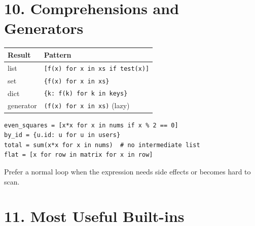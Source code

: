 \documentclass[10pt,a4paper]{article}
\newcommand{\py}[1]{\texttt{#1}}
\newenvironment{tbl}{\par\begin{lrbox}{\tblbox}\begin{minipage}{\linewidth}\compacttable}%
  {\end{minipage}\end{lrbox}\noindent\raisebox{\dp\tblbox}{\usebox{\tblbox}}\par}
\newcommand{\compacttable}{\fontsize{10}{11.2}\selectfont\setlength{\tabcolsep}{2.5pt}\renewcommand{\arraystretch}{1.08}}
\begin{document}
\begin{multicols}{2}
\section{10. Comprehensions and Generators}

\begin{tbl}
\begin{tabularx}{\linewidth}{@{}R{.32\linewidth}L@{}}
\toprule
\textbf{Result} & \textbf{Pattern} \\
\midrule
list & \py{[f(x) for x in xs if test(x)]} \\
set & \py{\{f(x) for x in xs\}} \\
dict & \py{\{k: f(k) for k in keys\}} \\
generator & \py{(f(x) for x in xs)} (lazy) \\
\bottomrule
\end{tabularx}
\end{tbl}

\begin{lstlisting}
even_squares = [x*x for x in nums if x % 2 == 0]
by_id = {u.id: u for u in users}
total = sum(x*x for x in nums)  # no intermediate list
flat = [x for row in matrix for x in row]
\end{lstlisting}

Prefer a normal loop when the expression needs side effects or becomes hard to scan.

\section{11. Most Useful Built-ins}


\end{multicols}
\end{document}
